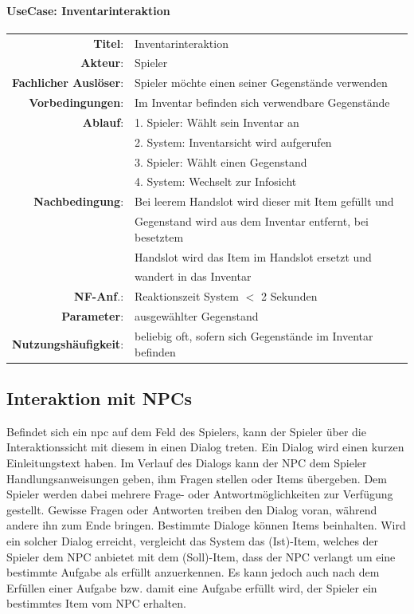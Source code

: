 \paragraph{UseCase: Inventarinteraktion}
\begin{center}
	\begin{tabular}{|r l|}
	  \hline
	  \textbf{Titel}: & Inventarinteraktion \\
	  \textbf{Akteur}: & \gls{Spieler} \\
	  \textbf{Fachlicher Auslöser}: & \gls{Spieler} möchte einen seiner Gegenstände verwenden \\
	  \textbf{Vorbedingungen}: & Im \gls{Inventar} befinden sich verwendbare Gegenstände \\
	  \hline
	  \textbf{Ablauf}:
		& 1. Spieler: Wählt sein Inventar an \\
		& 2. System: Inventarsicht wird aufgerufen \\
		& 3. Spieler: Wählt einen Gegenstand \\
		& 4. System: Wechselt zur Infosicht \\

	  \hline
	  \textbf{Nachbedingung}: & Bei leerem Handslot wird dieser mit Item gefüllt und \\
	  	& Gegenstand wird aus dem Inventar entfernt, bei besetztem \\
		& Handslot wird das Item im Handslot ersetzt und \\
		& wandert in das Inventar \\
	  \textbf{NF-Anf}.: & Reaktionszeit System $<$ 2 Sekunden \\
	  \textbf{Parameter}: & ausgewählter Gegenstand \\
	  \textbf{Nutzungshäufigkeit}: & beliebig oft, sofern sich Gegenstände im Inventar befinden \\
	  \hline
	\end{tabular}
\end{center}

\subsection{Interaktion mit NPCs}
Befindet sich ein \gls{npc} auf dem Feld des Spielers, kann der Spieler über die Interaktionssicht mit 
diesem in einen
Dialog treten. Ein Dialog wird einen kurzen Einleitungstext haben. Im Verlauf des Dialogs kann der NPC
dem \gls{Spieler} Handlungsanweisungen geben, ihm Fragen stellen oder Items übergeben. Dem Spieler werden
dabei mehrere Frage- oder Antwortmöglichkeiten zur Verfügung gestellt. Gewisse Fragen oder Antworten 
treiben den Dialog voran, während andere ihn zum Ende bringen.
Bestimmte Dialoge können \glspl{Item} beinhalten. Wird ein solcher Dialog erreicht, vergleicht das 
System das (Ist)-\gls{Item}, welches der \gls{Spieler} dem NPC anbietet mit dem (Soll)-\gls{Item}, dass
der NPC verlangt um eine bestimmte Aufgabe als erfüllt anzuerkennen. Es kann jedoch auch
nach dem Erfüllen einer Aufgabe bzw. damit eine Aufgabe erfüllt wird, der \gls{Spieler} ein bestimmtes 
\gls{Item} vom NPC erhalten.

